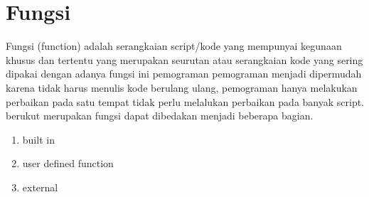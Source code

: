 \section{Fungsi}
Fungsi (function) adalah serangkaian script/kode yang mempunyai kegunaan khusus dan tertentu yang merupakan seurutan atau serangkaian kode yang sering dipakai dengan adanya fungsi ini pemograman pemograman menjadi dipermudah karena tidak harus menulis kode berulang ulang, pemograman hanya melakukan perbaikan pada satu tempat tidak perlu melalukan perbaikan pada banyak script. berukut merupakan fungsi dapat dibedakan menjadi beberapa bagian.
\begin{enumerate}
\item built in
\item user defined function
\item external
 \end{enumerate}